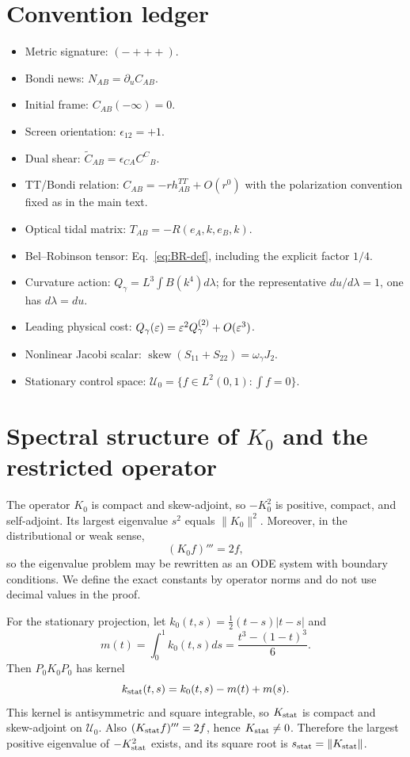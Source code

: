 \appendix
\section{Convention ledger}
\begin{itemize}
\item Metric signature: $(-+++)$. 
\item Bondi news: $N_{AB}=\partial_u C_{AB}$. 
\item Initial frame: $C_{AB}(-\infty)=0$. 
\item Screen orientation: $\epsilon_{12}=+1$. 
\item Dual shear: $\widetilde C_{AB}=\epsilon_{CA}C^C{}_B$. 
\item TT/Bondi relation: $C_{AB}=-rh^{TT}_{AB}+O(r^0)$ with the polarization convention fixed as in the main text.
\item Optical tidal matrix: $T_{AB}=-R(e_A,k,e_B,k)$. 
\item Bel--Robinson tensor: Eq.~\eqref{eq:BR-def}, including the explicit factor $1/4$. 
\item Curvature action: $Q_\gamma=L^3\int B(k^4)d\lambda$; for the representative $du/d\lambda=1$, one has $d\lambda=du$. 
\item Leading physical cost: $Q_\gamma(\varepsilon)=\varepsilon^2Q_\gamma^{(2)}+O(\varepsilon^3)$. 
\item Nonlinear Jacobi scalar: $\operatorname{skew}(S_{11}+S_{22})=\omega_\gamma J_2$. 
\item Stationary control space: $\mathcal U_0=\{f\in L^2(0,1):\int f=0\}$. 
\end{itemize}

\section{\texorpdfstring{Spectral structure of $K_0$ and the restricted operator}{Spectral structure of K0 and the restricted operator}}
The operator $K_0$ is compact and skew-adjoint, so $-K_0^2$ is positive, compact, and self-adjoint. Its largest eigenvalue $s^2$ equals $\|K_0\|^2$. Moreover, in the distributional or weak sense,
\[
(K_0f)'''=2f,
\]
so the eigenvalue problem may be rewritten as an ODE system with boundary conditions. We define the exact constants by operator norms and do not use decimal values in the proof.

For the stationary projection, let $k_0(t,s)=\frac12(t-s)|t-s|$ and
\[
m(t)=\int_0^1k_0(t,s)ds=\frac{t^3-(1-t)^3}{6}.
\]
Then $P_0K_0P_0$ has kernel
\begin{equation}
k_{\rm stat}(t,s)=k_0(t,s)-m(t)+m(s).
\label{eq:kstat-kernel}
\end{equation}
This kernel is antisymmetric and square integrable, so $K_{\rm stat}$ is compact and skew-adjoint on $\mathcal U_0$. Also $(K_{\rm stat}f)'''=2f$, hence $K_{\rm stat}\neq0$. Therefore the largest positive eigenvalue of $-K_{\rm stat}^2$ exists, and its square root is $s_{\rm stat}=\|K_{\rm stat}\|$.

